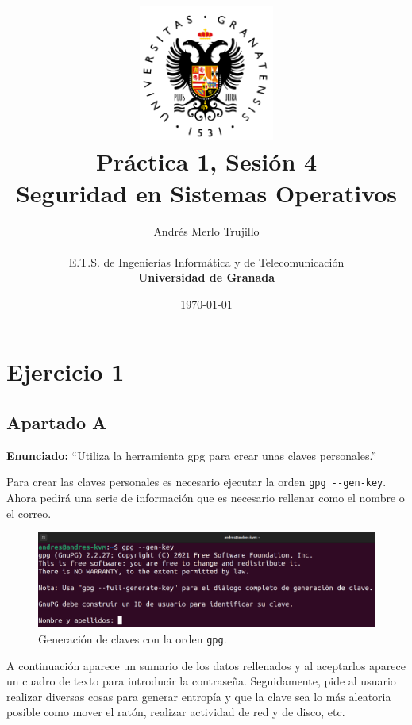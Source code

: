 \documentclass{article}
\title{
\includegraphics[width=1.75in]{imagenes/UGR-Logo.png} \\
\vspace*{1in}
\textbf{Práctica 1, Sesión 4} \\
Seguridad en Sistemas Operativos \\
\vspace*{0.5in}}
\author{Andrés Merlo Trujillo \\
\vspace*{0.5in} \\
E.T.S. de Ingenierías Informática y de Telecomunicación \\
\textbf{Universidad de Granada}} \date{\today}
\begin{document}
\begin{titlingpage}
    \maketitle
\end{titlingpage}

\tableofcontents

\newpage

\pagestyle{fancy}
\section{Ejercicio 1}

\subsection{Apartado A}

\textbf{Enunciado: }``Utiliza la herramienta gpg para crear unas claves personales.''

\bigskip

Para crear las claves personales es necesario ejecutar la orden \verb|gpg --gen-key|. Ahora pedirá una serie de información que es necesario rellenar como el nombre o el correo.

\begin{figure}[H]
    \includegraphics[width=\textwidth]{imagenes/Captura desde 2022-10-19 16-42-45.png}
    \caption{Generación de claves con la orden \texttt{gpg}.}
\end{figure}

A continuación aparece un sumario de los datos rellenados y al aceptarlos aparece un cuadro de texto para introducir la contraseña. Seguidamente, pide al usuario realizar diversas cosas para generar entropía y que la clave sea lo más aleatoria posible como mover el ratón, realizar actividad de red y de disco, etc.
\end{document}
